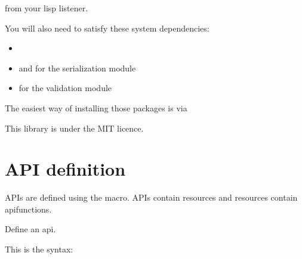 \documentclass[letterpaper,10pt,english]{sphinxmanual}
\begin{document}
\begin{sphinxVerbatim}[commandchars=\\\{\}]
 
\end{sphinxVerbatim}

from your lisp listener.

You will also need to satisfy these system dependencies:
\begin{itemize}
\item {} 

\item {} 
 and  for the serialization module

\item {} 
 for the validation module

\end{itemize}

The easiest way of installing those packages is via 

This library is under the MIT licence.


\chapter{API definition}
\label{\detokenize{api:api-definition}}\label{\detokenize{api::doc}}
APIs are defined using the {\hyperref[\detokenize{api:macro:rest-server:define-api}]{}} macro. APIs contain resources and resources contain api\sphinxhyphen{}functions.

\begin{fulllineitems}
\label{\detokenize{api:macro:rest-server:define-api}}
Define an api.

\end{fulllineitems}


This is the syntax:

\begin{sphinxVerbatim}[commandchars=\\\{\}]
    
\end{sphinxVerbatim}
\end{document}
